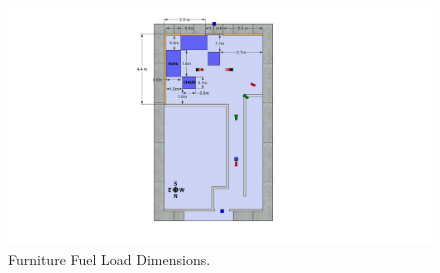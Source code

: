 \documentclass[12pt,oneside]{book}
\begin{document}
\begin{figure}[!ht]
	\includegraphics[width=6in]{../Figures/Pictures/DelCoSingleStoryFurnitureFuelLoad}
	\caption{Furniture Fuel Load Dimensions.}
	\label{fig:Furniture_Fuel_Load_Dimensions}
\end{figure}
\end{document}
